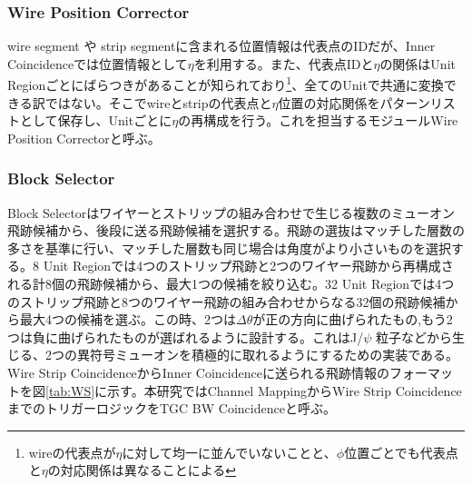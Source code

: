 \subsubsection*{Wire Position Corrector}
wire segment や strip segmentに含まれる位置情報は代表点のIDだが、Inner Coincidenceでは位置情報として$\eta$を利用する。また、代表点IDと$\eta$の関係はUnit Regionごとにばらつきがあることが知られており\footnote{wireの代表点が$\eta$に対して均一に並んでいないことと、$\phi$位置ごとでも代表点と$\eta$の対応関係は異なることによる}、全てのUnitで共通に変換できる訳ではない。そこでwireとstripの代表点と$\eta$位置の対応関係をパターンリストとして保存し、Unitごとに$\eta$の再構成を行う。これを担当するモジュールWire Position Correctorと呼ぶ。

\subsubsection*{Block Selector}
Block Selectorはワイヤーとストリップの組み合わせで生じる複数のミューオン飛跡候補から、後段に送る飛跡候補を選択する。飛跡の選抜はマッチした層数の多さを基準に行い、マッチした層数も同じ場合は角度がより小さいものを選択する。8 Unit Regionでは4つのストリップ飛跡と2つのワイヤー飛跡から再構成される計8個の飛跡候補から、最大1つの候補を絞り込む。32 Unit Regionでは4つのストリップ飛跡と8つのワイヤー飛跡の組み合わせからなる32個の飛跡候補から最大4つの候補を選ぶ。この時、2つは$\Delta\theta$が正の方向に曲げられたもの,もう2つは負に曲げられたものが選ばれるように設計する。これはJ/$\psi$ 粒子などから生じる、2つの異符号ミューオンを積極的に取れるようにするための実装である。
Wire Strip CoincidenceからInner Coincidenceに送られる飛跡情報のフォーマットを図\ref{tab:WS}に示す。本研究ではChannel MappingからWire Strip CoincidenceまでのトリガーロジックをTGC BW Coincidenceと呼ぶ。

